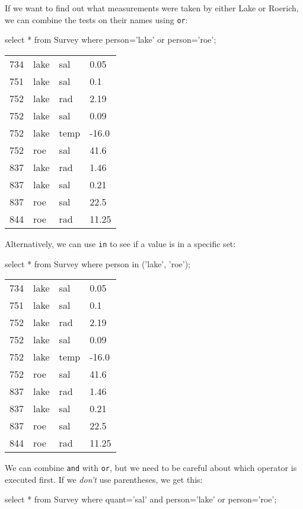 \documentclass{book}
\begin{document}
If we want to find out what measurements were taken by either Lake or
Roerich, we can combine the tests on their names using \texttt{or}:

\begin{VerbIn}
select * from Survey where person='lake' or person='roe';
\end{VerbIn}

\begin{tabular}{llll}
734 & lake & sal & 0.05 \\
751 & lake & sal & 0.1 \\
752 & lake & rad & 2.19 \\
752 & lake & sal & 0.09 \\
752 & lake & temp & -16.0 \\
752 & roe & sal & 41.6 \\
837 & lake & rad & 1.46 \\
837 & lake & sal & 0.21 \\
837 & roe & sal & 22.5 \\
844 & roe & rad & 11.25 \\
\end{tabular}

Alternatively, we can use \texttt{in} to see if a value is in a specific
set:

\begin{VerbIn}
select * from Survey where person in ('lake', 'roe');
\end{VerbIn}

\begin{tabular}{llll}
734 & lake & sal & 0.05 \\
751 & lake & sal & 0.1 \\
752 & lake & rad & 2.19 \\
752 & lake & sal & 0.09 \\
752 & lake & temp & -16.0 \\
752 & roe & sal & 41.6 \\
837 & lake & rad & 1.46 \\
837 & lake & sal & 0.21 \\
837 & roe & sal & 22.5 \\
844 & roe & rad & 11.25 \\
\end{tabular}

We can combine \texttt{and} with \texttt{or}, but we need to be careful
about which operator is executed first. If we \emph{don't} use
parentheses, we get this:

\begin{VerbIn}
select * from Survey where quant='sal' and person='lake' or person='roe';
\end{VerbIn}
\end{document}
